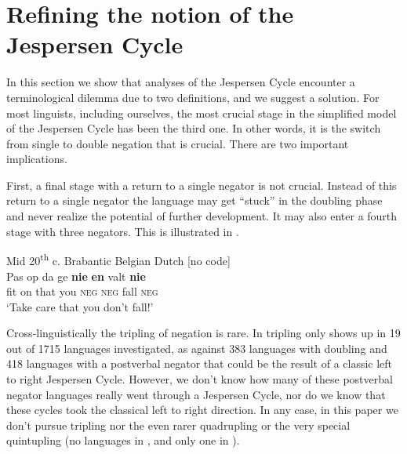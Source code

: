 ﻿\documentclass[output=paper]{langsci/langscibook}
\begin{document}
\section{Refining the notion of the Jespersen Cycle}\label{sec:int-2}

In this section we show that analyses of the Jespersen Cycle encounter a
terminological dilemma due to two definitions, and we suggest a solution.
For most linguists, including ourselves, the most crucial stage in the
simplified model of the Jespersen Cycle has been the third one. In other
words, it is the switch from single to double negation that is crucial.
There are two important implications.

First, a final stage with a return to a single negator is not crucial.
Instead of this return to a single negator the language may get ``stuck''
in the doubling phase and never realize the potential of further
development. It may also enter a fourth stage with three negators. This
is illustrated in .
%
\begin{exe}\ex \label{ex:int-brabantic}
          Mid 20\textsuperscript{th} c. Brabantic Belgian Dutch [no code]
\\
\gll Pas op da ge \textbf{nie} \textbf{en} valt \textbf{nie} \\
fit  on  that  you  \textsc{neg} \textsc{neg}  fall  \textsc{neg} \\
    \glt `Take care that you don't fall!'  
    \end{exe}
%
Cross-linguistically the tripling of negation is rare. In
\textcite[344]{Vossen2016} tripling only shows up in 19 out of 1715 languages
investigated, as against 383 languages with doubling and 418 languages with
a postverbal negator that could be the result of a classic left to right
Jespersen Cycle. However, we don't know how many of these postverbal
negator languages really went through a Jespersen Cycle, nor do we know
that these cycles took the classical left to right direction. In any case,
in this paper we don't pursue tripling \parencite[see][]{DevosAuwera2013}
nor the even rarer quadrupling \parencite[only 3 languages
in][343]{Vossen2016}  or the very special quintupling 
(no languages in \citealt[][]{Vossen2016}, and only one in 
\citealt[42]{AuweraVossen2017}).
\end{document}
